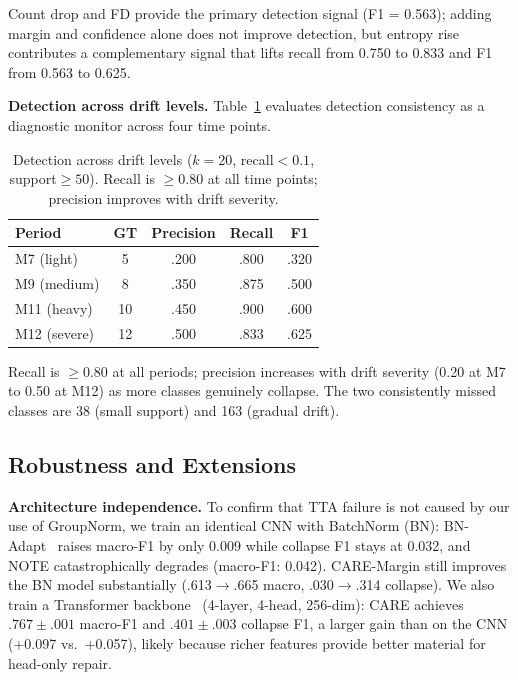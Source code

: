 \documentclass[journal]{IEEEtran}
\newcommand{\ours}{CARE}  %
\begin{document}
Count drop and FD provide the primary detection signal (F1 = 0.563); adding margin and confidence alone does not improve detection, but entropy rise contributes a complementary signal that lifts recall from 0.750 to 0.833 and F1 from 0.563 to 0.625.

\textbf{Detection across drift levels.}
Table~\ref{tab:trigger} evaluates detection consistency as a diagnostic monitor across four time points.

\begin{table}[t]
\centering
\caption{Detection across drift levels ($k{=}20$, recall${<}0.1$, support${\geq}50$). Recall is $\geq$0.80 at all time points; precision improves with drift severity.}
\label{tab:trigger}
\small
\begin{tabular}{@{}l cccc@{}}
\toprule
Period & GT & Precision & Recall & F1 \\
\midrule
M7 (light)   & 5  & .200 & .800 & .320 \\
M9 (medium)  & 8  & .350 & .875 & .500 \\
M11 (heavy)  & 10 & .450 & .900 & .600 \\
M12 (severe) & 12 & .500 & .833 & .625 \\
\bottomrule
\end{tabular}
\end{table}

Recall is $\geq$0.80 at all periods; precision increases with drift severity (0.20 at M7 to 0.50 at M12) as more classes genuinely collapse.
The two consistently missed classes are 38 (small support) and 163 (gradual drift).

\subsection{Robustness and Extensions}
\label{sec:robustness}

\textbf{Architecture independence.}
\label{sec:bn_verify}
\label{sec:transformer}
To confirm that TTA failure is not caused by our use of GroupNorm, we train an identical CNN with BatchNorm (BN): BN-Adapt~\cite{schneider2020bn} raises macro-F1 by only 0.009 while collapse F1 stays at 0.032, and NOTE catastrophically degrades (macro-F1: 0.042). \ours{}-Margin still improves the BN model substantially (.613$\to$.665 macro, .030$\to$.314 collapse).
We also train a Transformer backbone~\cite{vaswani2017attention} (4-layer, 4-head, 256-dim): \ours{} achieves $.767{\pm}.001$ macro-F1 and $.401{\pm}.003$ collapse F1, a larger gain than on the CNN (+0.097 vs.\ +0.057), likely because richer features provide better material for head-only repair.
\end{document}
